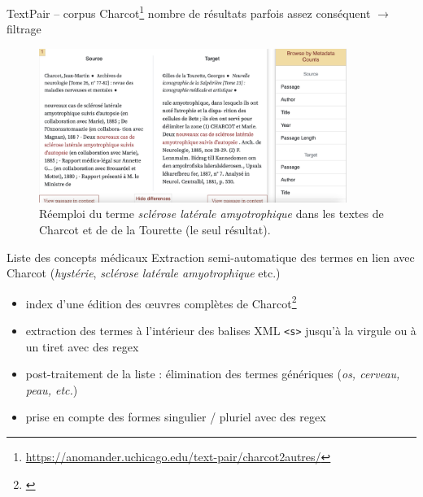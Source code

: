 \begin{frame}{TextPair -- corpus Charcot\footnote{\footnotesize\url{https://anomander.uchicago.edu/text-pair/charcot2autres/}}}
\danger{} nombre de
résultats parfois assez conséquent $\rightarrow$ filtrage
    \begin{figure}[!ht]
        \centering
        \includegraphics[width=100mm,scale=0.5]{pic/textpair.png}
        \caption{Réemploi du terme \textit{sclérose latérale amyotrophique} dans les textes de Charcot et de de la Tourette (le seul résultat).}
        \label{fig:enter-label}
    \end{figure}
\end{frame}

\begin{frame}{Liste des concepts médicaux}
    Extraction semi-automatique des termes en lien avec Charcot (\textit{hystérie}, \textit{sclérose latérale amyotrophique} etc.)
    \begin{itemize}
        \item index d’une édition des œuvres complètes de Charcot\footnote{\cite{charcot1890oeuvres}}
        \item extraction des termes à l'intérieur des balises \textsc{XML} \texttt{<s>} jusqu'à la virgule ou à un tiret avec des regex
        \item post-traitement de la liste : élimination des termes génériques (\textit{os, \textit{cerveau}, \textit{peau}, etc.})
        \item prise en compte des formes singulier / pluriel avec des regex
    \end{itemize}
\end{frame}

